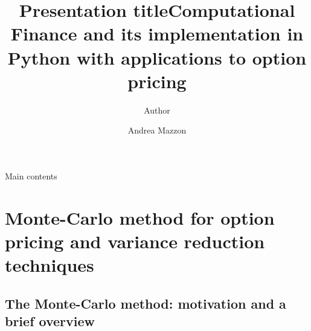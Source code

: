 \documentclass[9 pt]{beamer} %
\author{Author}
\title{Presentation title}
\begin{document}
\title[Computational finance for option pricing]{Computational Finance and its implementation in Python with applications to option pricing }
\author{Andrea Mazzon}
\date{}



\begin{frame}
\maketitle
\end{frame}



\begin{frame}{Main contents}
\tableofcontents
\end{frame}

\section{Monte-Carlo method for option pricing and variance reduction techniques}
\frame{  \tableofcontents[
    sectionstyle=show/shaded,
    subsectionstyle=show/shaded/shaded,
    subsubsectionstyle=show/shaded/shaded/shaded
    ]}


\subsection{The Monte-Carlo method: motivation and a brief overview}
\frame{  \tableofcontents[
    sectionstyle=show/shaded,
    subsectionstyle=show/shaded/shaded,
    subsubsectionstyle=show/shaded/shaded/shaded
    ]}
    
\end{document}
